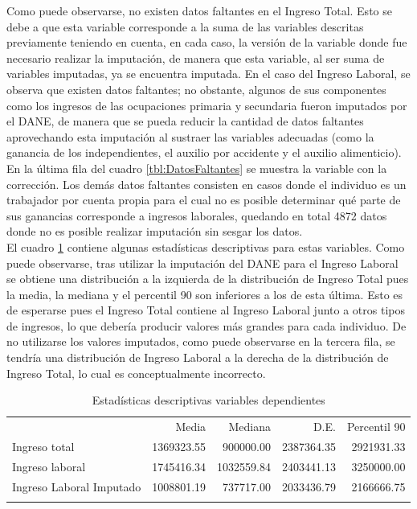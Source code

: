 \documentclass[11pt,a4paper]{article}
\begin{document}
Como puede observarse, no existen datos faltantes en el Ingreso Total. Esto se debe a que esta variable corresponde a la suma de las variables descritas previamente teniendo en cuenta, en cada caso, la versión de la variable donde fue necesario realizar la imputación,
de manera que esta variable, al ser suma de variables imputadas, ya se encuentra imputada. En el caso del Ingreso Laboral, se observa que existen datos faltantes; no obstante, algunos de sus componentes como los ingresos de las ocupaciones primaria y secundaria fueron imputados por el DANE, de manera que se pueda reducir la cantidad de datos faltantes
aprovechando esta imputación al sustraer las variables adecuadas (como la ganancia de los independientes, el auxilio por accidente y el auxilio alimenticio).
En la última fila del cuadro \ref{tbl:DatosFaltantes} se muestra la variable con la corrección. Los demás datos faltantes consisten en casos donde el individuo es un trabajador por cuenta propia para el cual no es posible determinar qué parte de sus ganancias corresponde a ingresos laborales, quedando en total 4872 datos donde no es posible realizar imputación sin sesgar los datos.\\

El cuadro \ref{tbl:estadisticasDesc} contiene algunas estadísticas descriptivas para estas variables. Como puede observarse, tras utilizar la imputación del DANE para el Ingreso Laboral se obtiene una distribución a la izquierda de la distribución de Ingreso Total pues la media, la mediana y el percentil 90 son inferiores a los de esta última. 
Esto es de esperarse pues el Ingreso Total contiene al Ingreso Laboral junto a otros tipos de ingresos, lo que debería producir valores más grandes para cada individuo. De no utilizarse los valores imputados, como puede observarse en la tercera fila, se tendría una distribución de Ingreso Laboral a la derecha de la distribución de Ingreso Total, lo cual es conceptualmente incorrecto.


\begin{table}[H]
  \centering
  \caption{Estadísticas descriptivas variables dependientes} 
  \label{tab:descriptive_dependent}
  \begingroup\fontsize{9pt}{10pt}\selectfont
  \begin{tabular}{lrrrr}
    \hline
  \addlinespace
    & Media & Mediana & D.E. & Percentil 90 \\
  \addlinespace
   \hline
   Ingreso total & 1369323.55 & 900000.00 & 2387364.35 & 2921931.33 \\ 
    Ingreso laboral & 1745416.34 & 1032559.84 & 2403441.13 & 3250000.00 \\ 
    Ingreso Laboral Imputado & 1008801.19 & 737717.00 & 2033436.79 & 2166666.75 \\ 
     \addlinespace
  \hline
  \addlinespace
  \end{tabular}
  \endgroup
  \label{tbl:estadisticasDesc}
  \end{table}
\end{document}
